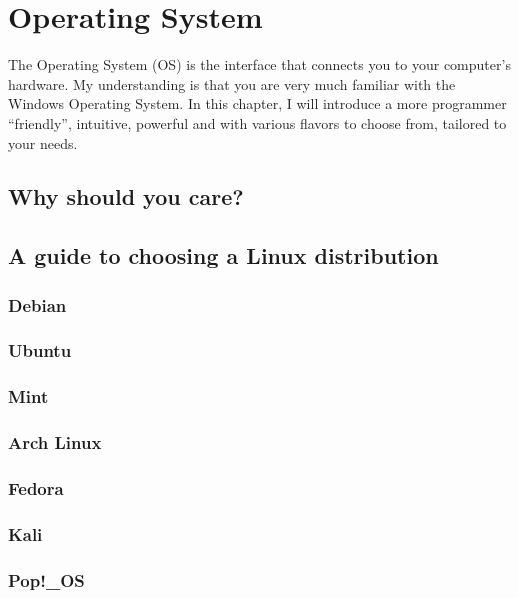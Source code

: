 \chapter{Operating System}\label{chp:os}

\minitoc

The Operating System (OS) is the interface that connects you to your computer's hardware.
My understanding is that you are very much familiar with the
\textsf{Windows} Operating System. In this chapter, I will introduce
a more programmer ``friendly'', intuitive, powerful and with various
flavors to choose from, tailored to your needs.

\section{Why should you care?}

\section{A guide to choosing a Linux distribution}


\subsection{Debian}
\subsection{Ubuntu}
\subsection{Mint}
\subsection{Arch Linux}
\subsection{Fedora}
\subsection{Kali}
\subsection{Pop!\_OS}
